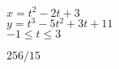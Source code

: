 {$x=t^2-2t+3$\\$y=t^3-5t^2+3t+11$\\$-1\leq t\leq 3$

\noindent\begin{minipage}{\linewidth}
\centering
{}
\end{minipage}
}
{$256/15$
}

